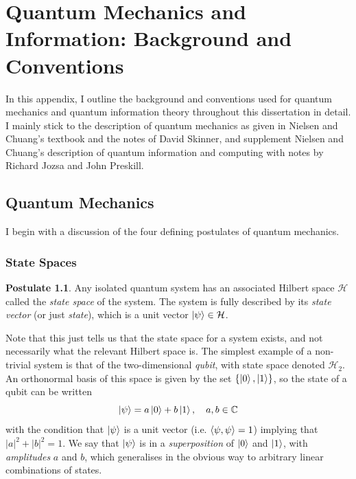 \documentclass[12pt,a4paper]{report}
\numberwithin{equation}{section}
\theoremstyle{definition}
\theoremstyle{theorem}
\theoremstyle{theorem}
\theoremstyle{example}
\theoremstyle{definition}
\newtheorem{postulate}{Postulate}
\begin{document}
\chapter{Quantum Mechanics and Information: Background and Conventions}

In this appendix, I outline the background and conventions used for quantum mechanics and quantum information theory throughout this dissertation in detail. I mainly stick to the description of quantum mechanics as given in Nielsen and Chuang's textbook \cite{NielsenChuang} and the notes of David Skinner, and supplement Nielsen and Chuang's description of quantum information and computing with notes by Richard Jozsa and John Preskill.


\section{Quantum Mechanics}
\label{sec:QM}

I begin with a discussion of the four defining postulates of quantum mechanics.

\subsection{State Spaces}

\begin{postulate}
	Any isolated quantum system has an associated Hilbert space $\mathcal{H}$ called the \textit{state space} of the system. The system is fully described by its \textit{state vector} (or just \textit{state}), which is a unit vector $\ket{\psi}\in\mathcal{H}$.
\end{postulate}

Note that this just tells us that the state space for a system exists, and not necessarily what the relevant Hilbert space is. The simplest example of a non-trivial system is that of the two-dimensional \textit{qubit}, with state space denoted $\mathcal{H}_{2}$. An orthonormal basis of this space is given by the set $\{\ket{0},\ket{1}\}$, so the state of a qubit can be written
\begin{equation}
	\ket{\psi}=a\ket{0}+b\ket{1},\quad a,b\in\mathbb{C}
\end{equation} 
with the condition that $\ket{\psi}$ is a unit vector (i.e. $\braket{\psi,\psi}=1$) implying that $|a|^{2}+|b|^{2}=1$. We say that $\ket{\psi}$ is in a \textit{superposition} of $\ket{0}$ and $\ket{1}$, with \textit{amplitudes} $a$ and $b$, which generalises in the obvious way to arbitrary linear combinations of states.
\end{document}
